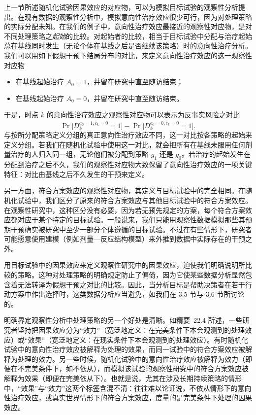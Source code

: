 上一节所述随机化试验因果效应的对应物，可以为模拟目标试验的观察性分析提出。在现有数据的观察性分析中，模拟意向性治疗效应很少可行，因为对处理策略的实际分配未知。在我们的例子中，意向性治疗效应最接近的观察性对应物，是对不同处理策略之\emph{起始}的比较。对起始者的比较，相当于目标试验中分配与治疗起始总在基线同时发生（无论个体在基线之后是否继续该策略）时的意向性治疗分析。我们可以用如下假想干预下结局分布的对比，来定义意向性治疗效应的这一观察性对应物
\begin{itemize}
\item 在基线起始治疗 $A_0=1$，并留在研究中直至随访结束；
\item 在基线起始治疗 $A_0=0$，并留在研究中直至随访结束。
\end{itemize}
于是，时点 $k$ 的意向性治疗效应之观察性对应物可以表示为反事实风险之对比
\[
\Pr\bigl[D_k^{a_0=1,\bar c_k=\bar 0}=1\bigr]-\Pr\bigl[D_k^{a_0=0,\bar c_k=\bar 0}=1\bigr].
\]
与按所分配策略定义分组的真正意向性治疗效应不同，这一对比按各策略的起始来定义分组。若我们在随机化试验中使用这一对比，就会把所有在基线未服用任何剂量治疗的人归入同一组，无论他们被分配到策略 $g_1$ 还是 $g_0$。若治疗的起始发生在分配到治疗之后不久，我们的观察性对应物大致保留了意向性治疗效应的一项关键特征：对比由基线之后不久发生的干预来定义。

另一方面，符合方案效应的观察性对应物，其定义与目标试验中的完全相同。在随机化试验中，我们区分了原来的符合方案效应与其他目标试验中的符合方案效应。在观察性研究中，这种区分没有必要，因为若无预先规定的方案，每个符合方案效应都对应于某个特定的目标试验。一般说来，我们只能用观察性数据模拟那些其预期干预确实被研究中至少一部分个体遵循的目标试验。不过在有些情形下，研究者可能愿意使用建模（例如剂量—反应结构模型）来外推到数据中实际存在的干预之外。

用目标试验中的因果效应来定义观察性研究中的因果效应，迫使我们明确说明所比较的策略。这种对处理策略的明确规定防止了偏倚，因为它使某些数据分析显然包含着无法转译为假想干预之对比的比较。因此，当分析目标是帮助决策者在若干行动方案中作出选择时，这类数据分析应当避免，如我们在 3.5 节与 3.6 节所讨论的。

明确界定观察性分析中处理策略的另一个好处是清晰。如精要~22.4 所述，一些研究者坚持把因果效应分为“效力”（宽泛地定义：在完美条件下本会观测到的处理效应）或“效果”（宽泛地定义：在现实条件下本会观测到的处理效应）。有时随机化试验中的意向性治疗效应被解释为处理的效果，而同一试验中的符合方案效应被解释为处理的效力。另一些时候，随机化试验中的意向性治疗效应被解释为效力（即便在不完美条件下，如不依从），而模拟该试验的观察性研究中的符合方案效应被解释为效果（即便在完美依从下）。也就是说，尤其在涉及长期持续策略的情形中，“效果”与“效力”这两个标签含混不清：往往难以论证说，不依从情形下的意向性治疗效应，或真实世界情形下的符合方案效应，度量的是完美条件下处理的因果效应。

